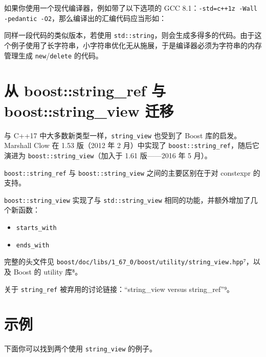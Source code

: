 如果你使用一个现代编译器，例如带了以下选项的 GCC 8.1：\texttt{-std=c++1z -Wall -pedantic -O2}，那么编译出的汇编代码应当形如：


同样一段代码的类似版本，若使用 \texttt{std::string}，则会生成多得多的代码。由于这个例子使用了长字符串，小字符串优化无从施展，于是编译器必须为字符串的内存管理生成 \texttt{new}/\texttt{delete} 的代码。

\section{从 boost::string\_ref 与 boost::string\_view 迁移}

与 C++17 中大多数新类型一样，\texttt{string\_view} 也受到了 Boost 库的启发。Marshall Clow 在 1.53 版（2012 年 2 月）中实现了 \texttt{boost::string\_ref}，随后它演进为 \texttt{boost::string\_view}（加入于 1.61 版——2016 年 5 月）。

\texttt{boost::string\_ref} 与 \texttt{boost::string\_view} 之间的主要区别在于对 constexpr 的支持。

\texttt{boost::string\_view} 实现了与 \texttt{std::string\_view} 相同的功能，并额外增加了几个新函数：

\begin{itemize}
\item \texttt{starts\_with}
\item \texttt{ends\_with}
\end{itemize}

完整的头文件见 \texttt{boost/doc/libs/1\_67\_0/boost/utility/string\_view.hpp}⁷，以及 Boost 的 utility 库⁸。



关于 \texttt{string\_ref} 被弃用的讨论链接：“string\_view versus string\_ref”⁹。


\section{示例}

下面你可以找到两个使用 \texttt{string\_view} 的例子。

